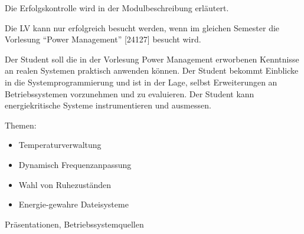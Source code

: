 \begin{course}

\setdoclanguagegerman
{}



\coursehead


\label{cour_6237.dp_997}


\begin{styleenv}
\begin{assessment}
Die Erfolgskontrolle wird in der Modulbeschreibung erläutert.


\end{assessment}

\begin{conditions}Die LV kann nur erfolgreich besucht werden, wenn im gleichen Semester die Vorlesung “Power Management” [24127] besucht wird.

\end{conditions}


\end{styleenv}

\begin{learningoutcomes}
Der Student soll die in der Vorlesung Power Management erworbenen Kenntnisse an realen Systemen praktisch anwenden können. Der Student bekommt Einblicke in die Systemprogrammierung und ist in der Lage, selbst Erweiterungen an Betriebssystemen vorzunehmen und zu evaluieren. Der Student kann energiekritische Systeme instrumentieren und ausmessen.


\end{learningoutcomes}

\begin{content}
Themen:

 \begin{itemize}\item Temperaturverwaltung  \item Dynamisch Frequenzanpassung  \item Wahl von Ruhezuständen  \item Energie-gewahre Dateisysteme  \end{itemize}
\end{content}

\begin{media}Präsentationen, Betriebssystemquellen

\end{media}





\end{course}
